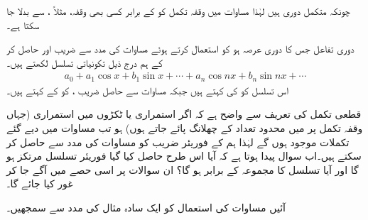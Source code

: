 چونکہ متکمل دوری ہیں لہٰذا مساوات  میں وقفہ تکمل کو  کے برابر کسی بھی وقفہ، مثلاً ،  سے بدلا جا سکتا ہے۔

دوری تفاعل  جس کا دوری عرصہ  ہو کو استعمال کرتے ہوئے مساوات  کی مدد سے  ضریب   اور  حاصل کر کے ہم درج ذیل تکونیاتی تسلسل لکھتے ہیں۔
\begin{align}\label{مساوات_فوریئر_تسلسل_تفاعل_کی}
a_0+a_1\cos x+b_1\sin x+\cdots+a_n\cos nx+b_n\sin nx+\cdots
\end{align}
اس تسلسل کو  کی  کہتے ہیں جبکہ مساوات  سے حاصل  ضریب  ،  کو  کے  کہتے ہیں۔

قطعی تکمل کی تعریف سے واضح ہے کہ اگر  استمراری یا ٹکڑوں میں استمراری (جہاں وقفہ تکمل پر  میں محدود تعداد کے چھلانگ پائے جاتے ہوں) ہو تب مساوات  میں دیے گئے تکملات موجود ہوں گے لہٰذا ہم  کے فوریئر  ضریب  کو مساوات  کی مدد سے حاصل کر سکتے ہیں۔اب سوال پیدا ہوتا ہے کہ آیا اس طرح حاصل کیا گیا فوریئر تسلسل مرتکز ہو گا اور آیا تسلسل کا مجموعہ  کے برابر ہو گا؟  ان سوالات پر اسی حصے میں آگے جا کر غور کیا جائے گا۔

آئیں مساوات  کی استعمال کو ایک سادہ مثال کی مدد سے سمجھیں۔

